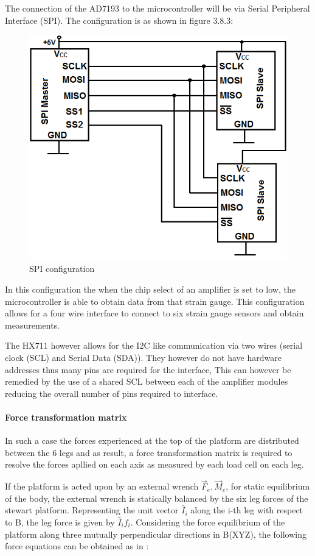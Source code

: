The connection of the AD7193 to the microcontroller will be via Serial Peripheral Interface (SPI). The configuration is as shown in figure 3.8.3:
\begin{center}
\begin{figure}
\centering
\includegraphics[width=0.55\linewidth]{Figures/SPI}
\caption[SPI configuration]{SPI configuration}
\end{figure}
\end{center}
In this configuration the when the chip select of an amplifier is set to low, the microcontroller is able to obtain data from that strain gauge. This configuration allows for a four wire interface to connect to six strain gauge sensors and obtain measurements.

The HX711 however allows for the I2C like communication via two wires (serial clock (SCL) and Serial Data (SDA)). They however do not have hardware addresses thus many pins are required for the interface, This can however be remedied by the use of a shared SCL between each of the amplifier modules reducing the overall number of pins required to interface.

\paragraph{Force transformation matrix} 
In such a case the forces experienced at the top of the platform are distributed between the 6 legs and as result, a force transformation matrix is required to resolve the forces apllied on each axis as measured by each load cell on each leg. 

If the platform is acted upon by an external wrench {$\vec{F}_e, \vec{M}_e$}, for static equilibrium of the body, the external wrench is statically balanced by the six leg forces of the stewart platform. Representing the unit vector $\hat{I}_i$ along the i-th leg with respect to B, the leg force is given  by $\hat{I}_if_i$. Considering the force equilibrium of the platform along  three mutually perpendicular directions in B(XYZ), the following force equations can be obtained as in \cite{dwarakanath_design_2001}:

